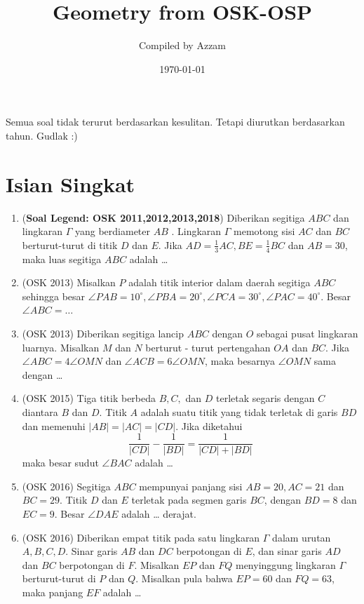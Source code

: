 \documentclass[12pt]{scrartcl}
\begin{document}
	\title{Geometry from OSK-OSP} %
	\date{\today}
	\author{Compiled by Azzam}
	\maketitle

\renewcommand*\contentsname{Daftar Isi}
\tableofcontents

\newpage
	Semua soal tidak terurut berdasarkan kesulitan.
	Tetapi diurutkan berdasarkan tahun.
	Gudlak :)
	\section{Isian Singkat}

\begin{enumerate}
	\item(\textbf{Soal Legend: OSK 2011,2012,2013,2018}) Diberikan segitiga $ABC$ dan lingkaran $\Gamma$ yang berdiameter $AB$ . Lingkaran $\Gamma$ memotong sisi $AC$ dan $BC$
berturut-turut di titik $D$ dan $E$. Jika $AD = \frac13 AC, BE =\frac14 BC$ dan $AB = 30$, maka luas segitiga $ABC$ adalah \dots
	
	
	
	\item
	(OSK 2013) Misalkan $P$ adalah titik interior dalam daerah segitiga $ABC$ sehingga besar $\angle PAB = 10^\circ, \angle PBA = 20^\circ, \angle PCA = 30^\circ, \angle PAC = 40^\circ$. Besar $\angle ABC = \dots$
	
	
	\item
	(OSK 2013) Diberikan segitiga lancip $ABC$ dengan $O$ sebagai pusat lingkaran luarnya. Misalkan $M$ dan $N$
berturut - turut pertengahan $OA$ dan $BC$. Jika $\angle ABC = 4\angle OMN$ dan $\angle ACB = 6\angle OMN$,
maka besarnya $\angle OMN$ sama dengan \dots
	
	\item(OSK 2015)
	Tiga titik berbeda $B, C,$ dan $D$ terletak segaris dengan $C$ diantara $B$ dan $D$. Titik $A$ adalah suatu
titik yang tidak terletak di garis $BD$ dan memenuhi $|AB| = |AC| = |CD|$. Jika diketahui
$$\dfrac{1}{|CD|}-\dfrac{1}{|BD|}=\dfrac{1}{|CD|+|BD|}$$
maka besar sudut $\angle BAC$ adalah \dots
	
	
	\item
	(OSK 2016) Segitiga $ABC$ mempunyai panjang sisi $AB = 20, AC = 21$ dan $ BC = 29$. Titik $D$ dan $ E$
terletak pada segmen garis $BC$, dengan $BD = 8$ dan $EC = 9$. Besar $\angle DAE$ adalah \dots
derajat.
	
	
	\item(OSK 2016)
	Diberikan empat titik pada satu lingkaran $\Gamma$ dalam urutan $A, B, C, D$. Sinar garis $AB$ dan
$DC$ berpotongan di $E$, dan sinar garis $AD$ dan $BC$ berpotongan di $F$. Misalkan $EP$ dan
$FQ$ menyinggung lingkaran $\Gamma$ berturut-turut di $P$ dan $Q$. Misalkan pula bahwa $EP = 60$
dan $FQ = 63$, maka panjang $EF$ adalah \dots
	

\end{enumerate}
\end{document}

